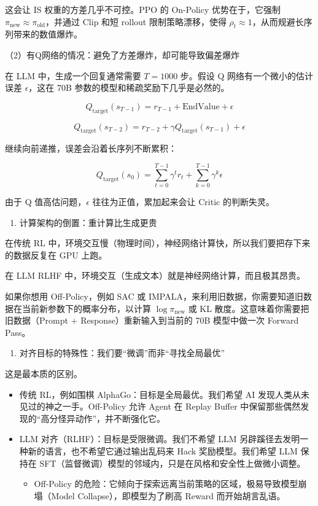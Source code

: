 这会让 IS 权重的方差几乎不可控。PPO 的 On-Policy 优势在于，它强制 \(\pi_{\mathrm{new}}\approx\pi_{\mathrm{old}}\)，并通过 Clip 和短 rollout 限制策略漂移，使得 \(\rho_t\approx1\)，从而规避长序列带来的数值爆炸。

（2）有Q网络的情况：避免了方差爆炸，却可能导致偏差爆炸

在 LLM 中，生成一个回复通常需要 \(T=1000\) 步。假设 Q 网络有一个微小的估计误差 \(\epsilon\)，这在 70B 参数的模型和稀疏奖励下几乎是必然的。

\[
Q_{\mathrm{target}}(s_{T-1})
=
r_{T-1}
+\mathrm{EndValue}
+\epsilon
\]

\[
Q_{\mathrm{target}}(s_{T-2})
=
r_{T-2}
+\gamma Q_{\mathrm{target}}(s_{T-1})
+\epsilon
\]

继续向前递推，误差会沿着长序列不断累积：

\[
Q_{\mathrm{target}}(s_0)
=
\sum_{t=0}^{T-1}\gamma^t r_t
+
\sum_{k=0}^{T-1}\gamma^k \epsilon
\]

由于 Q 值高估问题，\(\epsilon\) 往往为正值，累加起来会让 Critic 的判断失灵。

\begin{enumerate}
\def\labelenumi{\arabic{enumi}.}
\setcounter{enumi}{1}
\tightlist
\item
  计算架构的倒置：重计算比生成更贵
\end{enumerate}

在传统 RL 中，环境交互慢（物理时间），神经网络计算快，所以我们要把存下来的数据反复在 GPU 上跑。

在 LLM RLHF 中，环境交互（生成文本）就是神经网络计算，而且极其昂贵。

如果你想用 Off-Policy，例如 SAC 或 IMPALA，来利用旧数据，你需要知道旧数据在当前新参数下的概率分布，以计算 \(\log\pi_{\mathrm{new}}\) 或 KL 散度。这意味着你需要把旧数据（Prompt + Response）重新输入到当前的 70B 模型中做一次 Forward Pass。

\begin{enumerate}
\def\labelenumi{\arabic{enumi}.}
\setcounter{enumi}{2}
\tightlist
\item
  对齐目标的特殊性：我们要``微调''而非``寻找全局最优''
\end{enumerate}

这是最本质的区别。

\begin{itemize}
\tightlist
\item
  传统 RL，例如围棋 AlphaGo：目标是全局最优。我们希望 AI 发现人类从未见过的神之一手。Off-Policy 允许 Agent 在 Replay Buffer 中保留那些偶然发现的``高分怪异动作''，并不断强化它。
\item
  LLM 对齐（RLHF）：目标是受限微调。我们不希望 LLM 另辟蹊径去发明一种新的语言，也不希望它通过输出乱码来 Hack 奖励模型。我们希望 LLM 保持在 SFT（监督微调）模型的邻域内，只是在风格和安全性上做微小调整。

  \begin{itemize}
  \tightlist
  \item
    Off-Policy 的危险：它倾向于探索远离当前策略的区域，极易导致模型崩塌（Model Collapse），即模型为了刷高 Reward 而开始胡言乱语。
  \end{itemize}
\end{itemize}

